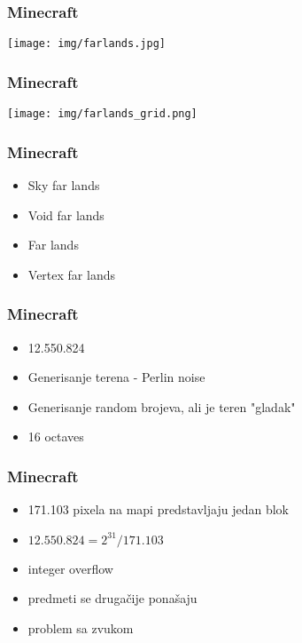 \documentclass{beamer}
\begin{document}
\begin{frame}
    \frametitle{Minecraft}
    \begin{center}
        \texttt{[image: img/farlands.jpg]}
    \end{center}
\end{frame}

\begin{frame}
    \frametitle{Minecraft}
    \begin{center}
        \texttt{[image: img/farlands\_grid.png]}
    \end{center}
\end{frame}

\begin{frame}
    \frametitle{Minecraft}
    \begin{itemize}
        \item Sky far lands \newline
        \item Void far lands \newline
        \item Far lands \newline
        \item Vertex far lands \newline
    \end{itemize}
\end{frame}

\begin{frame}
    \frametitle{Minecraft}
    \begin{itemize}
        \item 12.550.824 \newline
        \item Generisanje terena - Perlin noise \newline
        \item Generisanje random brojeva, ali je teren "gladak" \newline
        \item 16 octaves
    \end{itemize}
\end{frame}

\begin{frame}
    \frametitle{Minecraft}
    \begin{itemize}
        \item 171.103 pixela na mapi predstavljaju jedan blok \newline
        \item $12.550.824 = 2^{31} / 171.103$ \newline
        \item integer overflow \newline
        \item predmeti se drugačije ponašaju \newline
        \item problem sa zvukom
    \end{itemize}
\end{frame}
\end{document}
